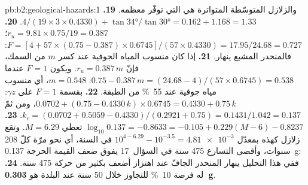 \begin{solution}{pb:b2:geological-hazards:1}
والزلازل المتوسّطة المتواترة هي التي توفّر معظمه.
\textbf{19.} $4/(19 \times 3 \times 0.4330) + \tan\ang{34}/\tan\ang{30} = 0.162 + 1.168 = 1.33$.
\textbf{20.} $r_u = 9.81 \times 0.75/19 = 0.387$؛ $F = [4 + 57 \times (0.75 - 0.387) \times
0.6745]/(57 \times 0.4330) = 17.95/24.68 = 0.727$: فالمنحدر المشبع ينهار.
\textbf{21.} إذا كان منسوب المياه الجوفية عند كسر $m$ من السمك، فإنّ $r_u = 0.387\,m$. ويكون $F = 1$ عندما
$0.75 - 0.387\,m = (24.68 - 4)/(57 \times 0.6745) = 0.538$: $m = 0.548$، أي منسوب مياه جوفية عند
\qty{55}{\percent} من الطبقة.
\textbf{22.} بقسمة $F = 1$ على $\gamma z$: $0.0702 + (0.75 - 0.4330\,k) \times 0.6745 = 0.4330 +
0.75\,k$، ومن ثمّ $k_c = (0.0702 + 0.5059 - 0.4330)/(0.2921 + 0.75) = 0.1431/1.042 = 0.137$.
\textbf{23.} $\log_{10} 0.137 = -0.8633 = -0.105 + 0.229(M - 6) - 0.8237$ تعطي $M = 6.29$. وتقع زلازل
كهذه بمعدّل $10^{4 - 6.29} - 10^{-3.5} = \num{4.81e-3}$ في السنة، أي نحو مرّة كلّ 208 سنوات،
وأقصى التسارع  475 سنة في السؤال~17 يفوق ضعف القيمة الحرجة \qty{0.137}{g}: ففي هذا
التحليل ينهار المنحدر الجافّ عند اهتزاز أضعف بكثير من حركة  475 سنة.
\textbf{24.}  له فرصة \qty{10}{\percent} للتجاوز خلال 50
سنة عند البلدة هو \textbf{\qty[text-series-to-math=true]{0.303}{g}}.
\end{solution}
